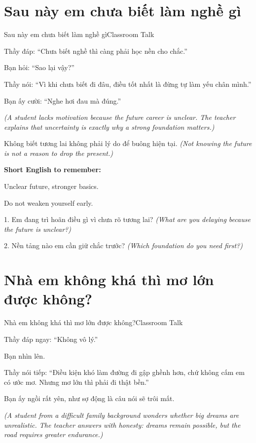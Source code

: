 \section{Sau này em chưa biết làm nghề gì}
\begin{truyen}{Sau này em chưa biết làm nghề gì}{Classroom Talk}

Thầy đáp: ``Chưa biết nghề thì càng phải học nền cho chắc.''

Bạn hỏi: ``Sao lại vậy?''

Thầy nói: ``Vì khi chưa biết đi đâu, điều tốt nhất là đừng tự làm yếu chân mình.''

Bạn ấy cười: ``Nghe hơi đau mà đúng.''

\textit{(A student lacks motivation because the future career is unclear. The teacher explains that uncertainty is exactly why a strong foundation matters.)}
\end{truyen}

\begin{baihoc}
Không biết tương lai không phải lý do để buông hiện tại.
\textit{(Not knowing the future is not a reason to drop the present.)}
\end{baihoc}

\begin{ghinhoanh}
\textbf{Short English to remember:}

Unclear future, stronger basics.

Do not weaken yourself early.
\end{ghinhoanh}

\begin{tuhocnhanh}
1. Em đang trì hoãn điều gì vì chưa rõ tương lai? \textit{(What are you delaying because the future is unclear?)}

2. Nền tảng nào em cần giữ chắc trước? \textit{(Which foundation do you need first?)}
\end{tuhocnhanh}
\ngancach

\section{Nhà em không khá thì mơ lớn được không?}
\begin{truyen}{Nhà em không khá thì mơ lớn được không?}{Classroom Talk}

Thầy đáp ngay: ``Không vô lý.''

Bạn nhìn lên.

Thầy nói tiếp: ``Điều kiện khó làm đường đi gập ghềnh hơn, chứ không cấm em có ước mơ. Nhưng mơ lớn thì phải đi thật bền.''

Bạn ấy ngồi rất yên, như sợ động là câu nói sẽ trôi mất.

\textit{(A student from a difficult family background wonders whether big dreams are unrealistic. The teacher answers with honesty: dreams remain possible, but the road requires greater endurance.)}
\end{truyen}

